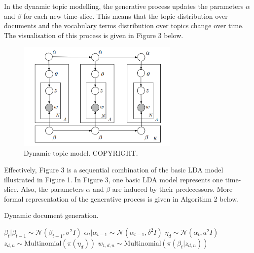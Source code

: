 \documentclass{mprop}
\begin{document}
\par In the dynamic topic modelling, the generative process updates the parameters $\alpha$ and $\beta$ for each new time-slice. This means that the topic distribution over documents and the vocabulary terms distribution over topics change over time. The visualisation of this process is given in Figure 3 below.
\begin{figure}[H]
  \centering
  \includegraphics[width=0.7\textwidth]{dynamic_topic_model}
  \caption{Dynamic topic model. COPYRIGHT.}
  \label{fig:dtm}
\end{figure}
Effectively, Figure 3 is a sequential combination of the basic LDA model illustrated in Figure 1. In Figure 3, one basic LDA model represents one time-slice. Also, the parameters $\alpha$ and $\beta$ are induced by their predecessors. More formal representation of the generative process is given in Algorithm 2 below. 
\begin{algorithm}[H]
\caption{Dynamic document generation.}
\label{alg:dynamic_document_generation}
\begin{algorithmic}[2]
\State $\beta_t | \beta_{t-1} \sim \mathcal{N}(\beta_{t-1}, \sigma^2I)$
\State $\alpha_t | \alpha_{t-1} \sim \mathcal{N}(\alpha_{t-1}, \delta^2I)$
\State $\eta_d \sim \mathcal{N}(\alpha_{t}, a^2I)$
\State $z_{d, n} \sim \mbox{Multinomial}(\pi(\eta_d))$
\State $w_{t, d, n} \sim \mbox{Multinomial}(\pi(\beta_t | z_{d, n}))$
\EndFor
\EndFor
\end{algorithmic}
\end{algorithm}
\end{document}
